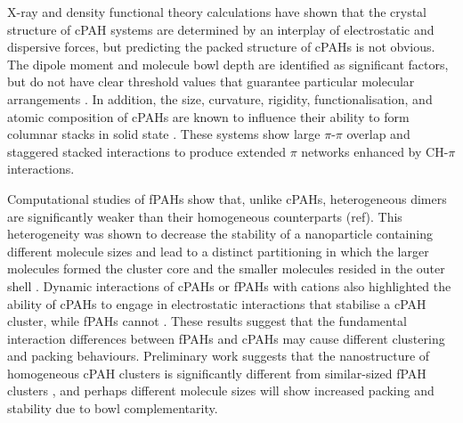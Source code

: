 X-ray and density functional theory calculations have shown that the crystal structure of cPAH systems are determined by an interplay of electrostatic and dispersive forces, but predicting the packed structure of cPAHs is not obvious. The dipole moment and molecule bowl depth are identified as significant factors, but do not have clear threshold values that guarantee particular molecular arrangements \cite{Filatov2010}. In addition, the size, curvature, rigidity, functionalisation, and atomic composition of cPAHs are known to influence their ability to form columnar stacks in solid state \cite{wang2015electronic,scott1999geodesic,grabowsky2010electron,sygula1994bowl,bronstein2002practical,forkey1997crystallographic,roch2017indenocorannulene,petrukhina2004hemibuckminsterfullerene,petrukhina2005unprecedented,Filatov2010,sakurai2005structural,imamura1999triphenyleno,wu2006aromatic,sanyal2014functional}. These systems show large $\pi$-$\pi$ overlap and staggered stacked interactions to produce extended $\pi$ networks enhanced by CH-$\pi$ interactions.

Computational studies of fPAHs show that, unlike cPAHs, heterogeneous dimers are significantly weaker than their homogeneous counterparts (ref). This heterogeneity was shown to decrease the stability of a nanoparticle containing different molecule sizes and lead to a distinct partitioning in which the larger molecules formed the cluster core and the smaller molecules resided in the outer shell \cite{bowal2018partitioning}. Dynamic interactions of cPAHs or fPAHs with cations also highlighted the ability of cPAHs to engage in electrostatic interactions that stabilise a cPAH cluster, while fPAHs cannot \cite{bowal2019ion}. These results suggest that the fundamental interaction differences between fPAHs and cPAHs may cause different clustering and packing behaviours. Preliminary work suggests that the nanostructure of homogeneous cPAH clusters is significantly different from similar-sized fPAH clusters \cite{bowal2019ion}, and perhaps different molecule sizes will show increased packing and stability due to bowl complementarity.

